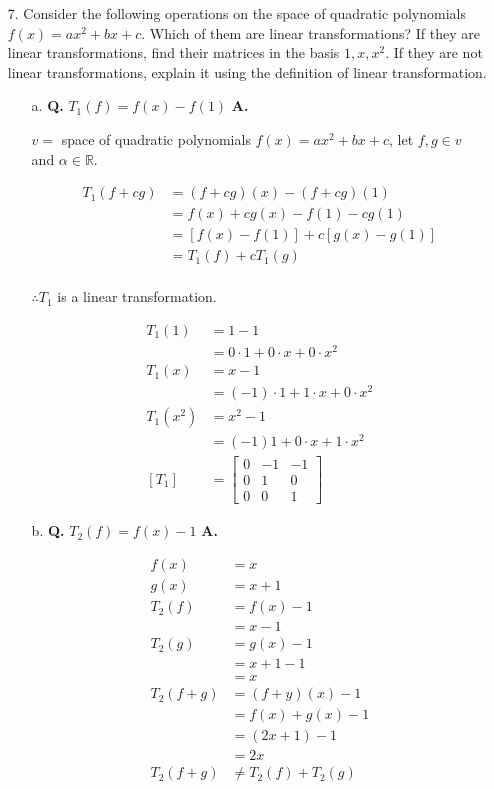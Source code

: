 \documentclass[main.tex]{subfiles}
\begin{document}
\begin{enumerate}
\begin{enumerate}
    \end{enumerate} 

\item[7.] Consider the following operations on the space of quadratic polynomials $f(x)=a x^{2}+b x+c$. Which of them are linear transformations? If they are linear transformations, find their matrices in the basis $1, x, x^{2}$. If they are not linear transformations, explain it using the definition of linear transformation.
    \begin{enumerate}
    \item [a.] \textbf{Q.} $T_{1}(f)=f(x)-f(1)$ 
    \textbf{A.}
    
    $v=$ space of quadratic polynomials $f(x) = ax^{2} + bx + c$, let $f, g \in v$ and $\alpha \in \mathbb{R}$.

    $$
    \begin{aligned}
    T_{1}(f + cg) &= (f+cg)(x)-(f+cg)(1) \\
    &= f(x)+c g(x)-f(1)-c g(1) \\
    &= [f(x)-f(1)]+c[g(x)-g(1)] \\
    &= T_{1}(f) + c T_{1}(g) \\
    \end{aligned}
    $$

    $\therefore T_{1}$ is a linear transformation.

    $$
    \begin{aligned}
    T_{1}(1) &= 1-1\\ 
    & = 0 \cdot 1+0 \cdot x+0 \cdot x^{2}\\
    T_{1}(x) &= x-1 \\
    & = (-1) \cdot 1 + 1 \cdot x + 0 \cdot x^{2}\\
    T_{1}(x^{2}) &= x^{2}-1 \\
    &= (-1) 1 + 0 \cdot x + 1 \cdot x^{2}\\
    \left[T_1\right] &= \left[\begin{array}{ccc}
    0 & -1 & -1 \\
    0 & 1 & 0 \\
    0 & 0 & 1
    \end{array}\right]
    \end{aligned}
    $$
    
    \item [b.] \textbf{Q.} $T_{2}(f)=f(x)-1$ 
    \textbf{A.}

    $$
    \begin{aligned}
    f(x) &= x\\
    g(x) &= x+1\\
    T_{2}(f) &= f(x)- 1 \\
    &=x-1 \\
    T_{2}(g)&= g(x)-1 \\
    &=x+1-1 \\
    &=x \\
    T_{2}(f+g) &= (f+y)(x)-1 \\
    &= f(x)+g(x)-1 \\
    &= (2 x+1)-1 \\
    &= 2x \\
    T_{2}(f+g) &\neq T_{2}(f)+T_{2}(g)
    \end{aligned}
    $$


\end{enumerate}
\end{enumerate}
\end{document}
